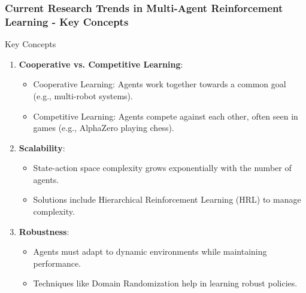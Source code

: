 \documentclass[aspectratio=169]{beamer}
\begin{document}
\begin{frame}[fragile]
    \frametitle{Current Research Trends in Multi-Agent Reinforcement Learning - Key Concepts}
    \begin{block}{Key Concepts}
        \begin{enumerate}
            \item \textbf{Cooperative vs. Competitive Learning}:
            \begin{itemize}
                \item Cooperative Learning: Agents work together towards a common goal (e.g., multi-robot systems).
                \item Competitive Learning: Agents compete against each other, often seen in games (e.g., AlphaZero playing chess).
            \end{itemize}
            \item \textbf{Scalability}:
            \begin{itemize}
                \item State-action space complexity grows exponentially with the number of agents.
                \item Solutions include Hierarchical Reinforcement Learning (HRL) to manage complexity.
            \end{itemize}
            \item \textbf{Robustness}:
            \begin{itemize}
                \item Agents must adapt to dynamic environments while maintaining performance.
                \item Techniques like Domain Randomization help in learning robust policies.
            \end{itemize}
        \end{enumerate}
    \end{block}
\end{frame}
\end{document}
